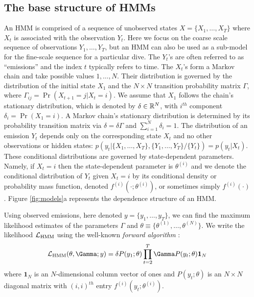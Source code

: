 \subsection{The base structure of HMMs}

An HMM is comprised of a sequence of unobserved states $X = \big\{X_1, \ldots, X_T\big\}$ where $X_t$ is associated with the observation $Y_t$. Here we focus on the coarse scale sequence of observations $Y_1,\ldots, Y_T$, but an HMM can also be used as a sub-model for the fine-scale sequence for a particular dive. The $Y_t$'s are often referred to as ``emissions'' and the index $t$ typically refers to time. 
The $X_t$'s form a Markov chain and take possible values $1, \ldots, N$. Their distribution is governed by the distribution of the initial state $X_1$ and the $N \times N$ transition probability matrix $\Gamma$, where $\Gamma_{ij} = \Pr(X_{t+1} = j | X_t = i)$. 
%
We assume that $X_1$ follows the chain's stationary distribution, which is denoted by $\delta \in \mathbb{R}^N$, with $i^{th}$ component
$\delta_i = \Pr(X_1 = i).$
A Markov chain's stationary distribution is determined by its probability transition matrix via $\delta = \delta \Gamma$ and $\sum_{i=1}^N \delta_i = 1$.
%
The distribution of an emission $Y_t$ depends only on the corresponding state $X_t$ and no other observations or hidden states: $p\left(y_t|\{X_1,\ldots, X_T\},\{Y_1,\ldots, Y_T\}/ \{Y_t\}\right) = p(y_t|X_t)$.
%
These conditional distributions are governed by state-dependent parameters. Namely, if $X_t = i$ then the state-dependent parameter is $\theta^{(i)}$ and we denote the conditional distribution of $Y_t$ given $X_t=i$ by its conditional density or probability mass function, denoted $f^{(i)}(\cdot ; \theta^{(i)})$, or sometimes simply $f^{(i)}(\cdot)$.
%
Figure \ref{fig:models}a represents the dependence structure of an HMM.

Using observed emissions, here denoted $y = \{y_1,\ldots,y_T\}$, we can find the maximum likelihood estimates of the parameters $\Gamma$ and $\theta \equiv \{\theta^{(1)},\ldots,\theta^{(N)}\}$. We write the likelihood $\mathcal{L}_{\text{HMM}}$ using the  well-known \textit{forward algorithm} \citep{Zucchini:2016}:
%
$$\calL_{\text{HMM}}(\theta,\Gamma;y) = \delta P(y_1;\theta) \prod_{t=2}^T \Gamma P(y_t;\theta) \mathbf{1}_N$$
%
where $\mathbf{1}_N$ is an $N$-dimensional column vector of ones and
%
$P(y_t;\theta)$ is an $N \times N$ diagonal matrix with $(i,i)^{th}$ entry  $f^{(i)}(y_t; \theta^{(i)})$.
%

